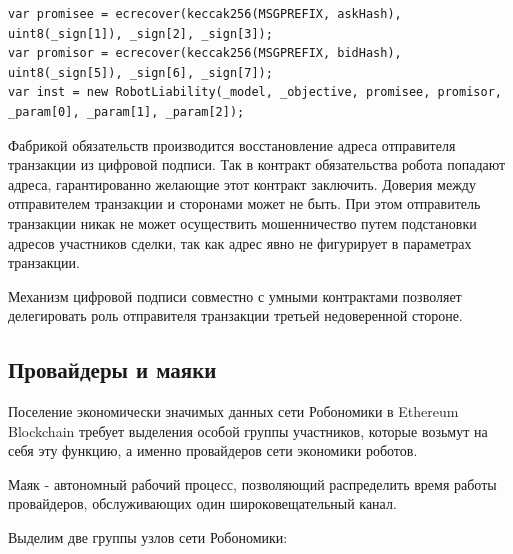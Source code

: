 \documentclass{article}
\begin{document}
\begin{lstlisting}
var promisee = ecrecover(keccak256(MSGPREFIX, askHash), uint8(_sign[1]), _sign[2], _sign[3]);
var promisor = ecrecover(keccak256(MSGPREFIX, bidHash), uint8(_sign[5]), _sign[6], _sign[7]);
var inst = new RobotLiability(_model, _objective, promisee, promisor, _param[0], _param[1], _param[2]);
\end{lstlisting}

Фабрикой обязательств производится восстановление адреса отправителя транзакции из цифровой подписи. Так в контракт обязательства робота попадают адреса, гарантированно желающие этот контракт заключить. Доверия между отправителем транзакции и сторонами может не быть. При этом отправитель транзакции никак не может осуществить мошенничество путем подстановки адресов участников сделки, так как адрес явно не фигурирует в параметрах транзакции.

Механизм цифровой подписи совместно с умными контрактами позволяет делегировать роль отправителя транзакции третьей недоверенной стороне.

\subsection{Провайдеры и маяки}

Поселение экономически значимых данных сети Робономики в Ethereum Blockchain требует выделения особой группы участников, которые возьмут на себя эту функцию, а именно провайдеров сети экономики роботов. 

Маяк - автономный рабочий процесс, позволяющий распределить время работы провайдеров, обслуживающих один широковещательный канал.

Выделим две группы узлов сети Робономики:
\end{document}
